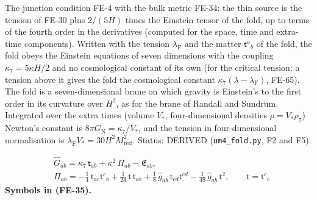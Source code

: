 \documentclass[
  10pt,
]{article}
\begin{document}
The junction condition FE-4 with the bulk metric FE-34: the thin source
is the tension of FE-30 plus \(2/(5H)\) times the Einstein tensor of the
fold, up to terms of the fourth order in the derivatives (computed for
the space, time and extra-time components). Written with the tension
\(\lambda_{\mathrm{F}}\) and the matter \(\mathsf{t}^a{}_b\) of the
fold, the fold obeys the Einstein equations of seven dimensions with the
coupling \(\kappa_7 = 5\kappa H/2\) and no cosmological constant of its
own (for the critical tension; a tension above it gives the fold the
cosmological constant \(\kappa_7(\lambda - \lambda_{\mathrm{F}})\),
FE-65). The fold is a seven-dimensional brane on which gravity is
Einstein's to the first order in its curvature over \(H^2\), as for the
brane of Randall and Sundrum. Integrated over the extra times (volume
\(V_*\), four-dimensional densities \(\rho = V_*\rho_7\)) Newton's
constant is \(8\pi G_{\mathrm{N}} = \kappa_7/V_*\), and the tension in
four-dimensional normalisation is
\(\lambda_{\mathrm{F}}V_* = 30H^2M_{\mathrm{red}}^2\). Status: DERIVED
(\texttt{um4\_fold.py}, F2 and F5).

\[
\begin{aligned}
&\hat G_{ab} = \kappa_7\,\mathsf{t}_{ab} + \kappa^2\,\Pi_{ab} - \mathfrak{E}_{ab},\\
&\Pi_{ab} = -\frac14\,\mathsf{t}_{ac}\mathsf{t}^c{}_b + \frac{1}{24}\,\mathsf{t}\,\mathsf{t}_{ab} + \frac18\,\hat g_{ab}\,\mathsf{t}_{cd}\mathsf{t}^{cd}
 - \frac{1}{48}\,\hat g_{ab}\,\mathsf{t}^2,\qquad \mathsf{t} = \mathsf{t}^c{}_c
\end{aligned} \tag{FE-35}
\] \textbf{Symbols in (FE-35).}
\end{document}
